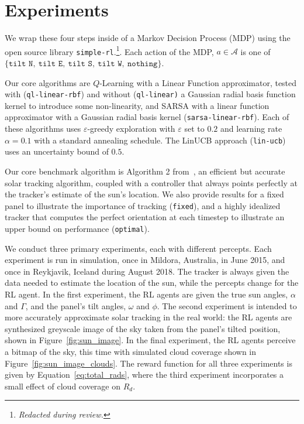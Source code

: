 \documentclass{article}
\newcommand{\mc}{\mathcal}
\begin{document}
\section{Experiments}

We wrap these four steps inside of a Markov Decision Process (MDP) using the open source library \texttt{simple-rl}.\footnote{{\it Redacted during review.}}. Each action of the MDP, $a \in \mc{A}$ is one of $\{\texttt{tilt N},\ \texttt{tilt E},\ \texttt{tilt S},\ \texttt{tilt W},\ \texttt{nothing}\}$.

Our core algorithms are $Q$-Learning with a Linear Function approximator, tested with (\texttt{ql-linear-rbf}) and without (\texttt{ql-linear)} a Gaussian radial basis function kernel to introduce some non-linearity, and SARSA with a linear function approximator with a Gaussian radial basis kernel (\texttt{sarsa-linear-rbf}). Each of these algorithms uses $\varepsilon$-greedy exploration with $\varepsilon$ set to $0.2$ and learning rate $\alpha = 0.1$ with a standard annealing schedule. The LinUCB approach (\texttt{lin-ucb}) uses an uncertainty bound of $0.5$.

Our core benchmark algorithm is Algorithm 2 from~\citet{Grena2012}, an efficient but accurate solar tracking algorithm, coupled with a controller that always points perfectly at the tracker's estimate of the sun's location. We also provide results for a fixed panel to illustrate the importance of tracking (\texttt{fixed}), and a highly idealized tracker that computes the perfect orientation at each timestep to illustrate an upper bound on performance (\texttt{optimal}).

We conduct three primary experiments, each with different percepts. Each experiment is run in simulation, once in Mildora, Australia, in June 2015, and once in Reykjavik, Iceland during August 2018. The tracker is always given the data needed to estimate the location of the sun, while the percepts change for the RL agent. In the first experiment, the RL agents are given the true sun angles, $\alpha$ and $\Gamma$, and the panel's tilt angles, $\omega$ and $\phi$. The second experiment is intended to more accurately approximate solar tracking in the real world: the RL agents are synthesized greyscale image of the sky taken from the panel's tilted position, shown in Figure~\ref{fig:sun_image}. In the final experiment, the RL agents perceive a bitmap of the sky, this time with simulated cloud coverage shown in Figure~\ref{fig:sun_image_clouds}. The reward function for all three experiments is given by Equation~\ref{eq:total_rads}, where the third experiment incorporates a small effect of cloud coverage on $R_d$.
\end{document}
